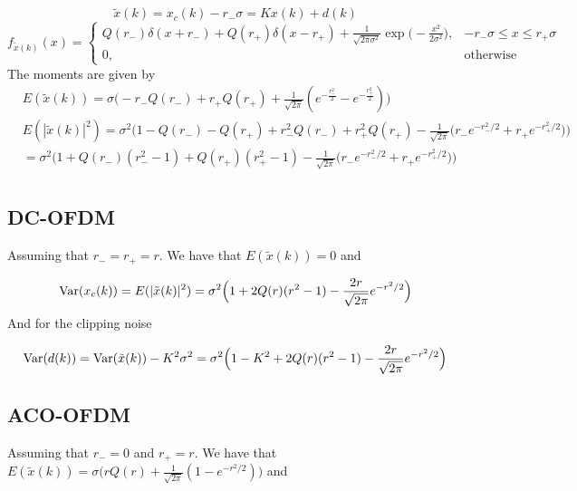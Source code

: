 \documentclass[a4paper]{article}
\begin{document}
\begin{equation} \label{Bussgangs}
\tilde{x}(k) = x_c(k) - r_-\sigma = Kx(k) + d(k)
\end{equation}
\begin{equation}
f_{\tilde{x}(k)}(x) = \begin{cases}
Q(r_-)\delta(x + r_-) + Q(r_+)\delta(x - r_+) + \frac{1}{\sqrt{2\pi\sigma^2}}\exp\Big(-\frac{x^2}{2\sigma^2}\Big), & -r_-\sigma \leq x   \leq  r_+\sigma \\
0, & \mathrm{otherwise}
\end{cases}
\end{equation}
The moments are given by
\begin{align}
& E(\tilde{x}(k)) = \sigma\Big(-r_-Q(r_-) + r_+Q(r_+) + \frac{1}{\sqrt{2\pi}}(e^{-\frac{r_-^2}{2}} - e^{-\frac{r_+^2}{2}})\Big) \\
& E(|\tilde{x}(k)|^2) = \sigma^2\Big(1 - Q(r_-) - Q(r_+) + r_-^2Q(r_-) + r_+^2Q(r_+) -  \frac{1}{\sqrt{2\pi}} \Big(r_-e^{-r_-^2/2} + r_+e^{-r_+^2/2}\Big) \Big) \\
& = \sigma^2\Big(1 + Q(r_-)(r_-^2 - 1) + Q(r_+)(r_+^2 - 1) -  \frac{1}{\sqrt{2\pi}} \Big(r_-e^{-r_-^2/2} + r_+e^{-r_+^2/2}\Big) \Big) \\
\end{align}

\subsection{DC-OFDM}
Assuming that $r_- = r_+ = r$. We have that $E(\tilde{x}(k))  = 0$ and 

\begin{equation}
\mathrm{Var}(x_c(k)) = E(|\tilde{x}(k)|^2) = \sigma^2\Big(1 + 2Q(r)(r^2 - 1) -  \frac{2r}{\sqrt{2\pi}} e^{-r^2/2} \Big) \\
\end{equation}
And for the clipping noise

\begin{equation}
\mathrm{Var}(d(k)) = \mathrm{Var}(\tilde{x}(k)) - K^2\sigma^2 = \sigma^2\Big(1 - K^2 + 2Q(r)(r^2 - 1) -  \frac{2r}{\sqrt{2\pi}} e^{-r^2/2} \Big) \\
\end{equation}

\subsection{ACO-OFDM}
Assuming that $r_- = 0$ and $r_+ = r$. We have that $E(\tilde{x}(k))  = \sigma\Big(rQ(r) + \frac{1}{\sqrt{2\pi}}(1 - e^{-r^2/2})\Big)$ and 
\end{document}

